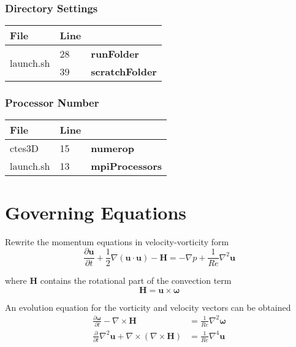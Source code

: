 \documentclass[titlepage,12pt,letter]{article}
\newcommand{\re}{Re}
\numberwithin{equation}{section}
\begin{document}
\subsubsection{Directory Settings}
\begin{table}[H]
	\centering 
	\renewcommand{\arraystretch}{1.4} 
	\begin{tabular}{l|l|l}
		File&Line& \\ \hline
		\multirow{2}{*}{launch.sh}&28&\textbf{runFolder}\\
		&39&\textbf{scratchFolder}\\ \hline		
	\end{tabular} 
\end{table} 

\subsubsection{Processor Number}
\begin{table}[H]
	\centering 
	\renewcommand{\arraystretch}{1.4} 
	\begin{tabular}{l|l|l}
		File&Line& \\ \hline
		ctes3D&15&\textbf{numerop}\\
		launch.sh&13&\textbf{mpiProcessors}\\ \hline		
	\end{tabular} 
\end{table} 


\section{Governing Equations}
Rewrite the momentum equations in velocity-vorticity form
\begin{equation}
	\frac{\partial \bm{u}}{\partial t}+\frac{1}{2} \nabla(\bm{u} \cdot \bm{u})-\bm{H}=-\nabla p+\frac{1}{\re} \nabla^{2} \bm{u} \label{eq:nse}
\end{equation}

where $\bm{H}$ contains the rotational part of the convection term
\begin{equation*}
	\bm{H}=\bm{u} \times \bm{\omega}
\end{equation*}

An evolution equation for the vorticity and velocity vectors can be obtained
\begin{align*}
	\frac{\partial \bm{\omega}}{\partial t}-\nabla \times \bm{H}&=\frac{1}{\re} \nabla^{2} \bm{\omega}\\
	\frac{\partial}{\partial t} \nabla^{2} \bm{u}+\nabla \times(\nabla \times \bm{H})&=\frac{1}{\re} \nabla^{4} \bm{u}
\end{align*}
\end{document}
